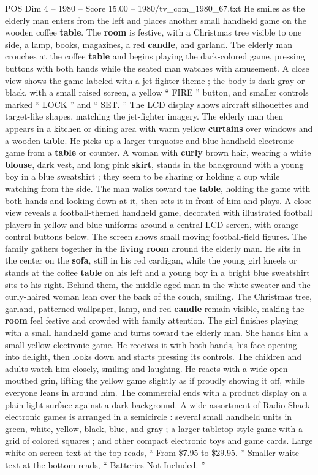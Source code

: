 \begin{textsample}{POS Dim 4 – 1980 – Score 15.00 – 1980/tv\_com\_1980\_67.txt}
He smiles as the elderly man enters from the left and places another small handheld game on the wooden coffee \textbf{table}.
The \textbf{room} is festive, with a Christmas tree visible to one side, a lamp, books, magazines, a red \textbf{candle}, and garland.
The elderly man crouches at the coffee \textbf{table} and begins playing the dark-colored game, pressing buttons with both hands while the seated man watches with amusement.
A close view shows the game labeled with a jet-fighter theme ; the body is dark gray or black, with a small raised screen, a yellow “ FIRE ” button, and smaller controls marked “ LOCK ” and “ SET. ” The LCD display shows aircraft silhouettes and target-like shapes, matching the jet-fighter imagery.
The elderly man then appears in a kitchen or dining area with warm yellow \textbf{curtains} over windows and a wooden \textbf{table}.
He picks up a larger turquoise-and-blue handheld electronic game from a \textbf{table} or counter.
A woman with \textbf{curly} brown hair, wearing a white \textbf{blouse}, dark vest, and long pink \textbf{skirt}, stands in the background with a young boy in a blue sweatshirt ; they seem to be sharing or holding a cup while watching from the side.
The man walks toward the \textbf{table}, holding the game with both hands and looking down at it, then sets it in front of him and plays.
A close view reveals a football-themed handheld game, decorated with illustrated football players in yellow and blue uniforms around a central LCD screen, with orange control buttons below.
The screen shows small moving football-field figures.
The family gathers together in the \textbf{living} \textbf{room} around the elderly man.
He sits in the center on the \textbf{sofa}, still in his red cardigan, while the young girl kneels or stands at the coffee \textbf{table} on his left and a young boy in a bright blue sweatshirt sits to his right.
Behind them, the middle-aged man in the white sweater and the curly-haired woman lean over the back of the couch, smiling.
The Christmas tree, garland, patterned wallpaper, lamp, and red \textbf{candle} remain visible, making the \textbf{room} feel festive and crowded with family attention.
The girl finishes playing with a small handheld game and turns toward the elderly man.
She hands him a small yellow electronic game.
He receives it with both hands, his face opening into delight, then looks down and starts pressing its controls.
The children and adults watch him closely, smiling and laughing.
He reacts with a wide open-mouthed grin, lifting the yellow game slightly as if proudly showing it off, while everyone leans in around him.
The commercial ends with a product display on a plain light surface against a dark background.
A wide assortment of Radio Shack electronic games is arranged in a semicircle : several small handheld units in green, white, yellow, black, blue, and gray ; a larger tabletop-style game with a grid of colored squares ; and other compact electronic toys and game cards.
Large white on-screen text at the top reads, “ From \$7.95 to \$29.95. ” Smaller white text at the bottom reads, “ Batteries Not Included. ”

\end{textsample}
